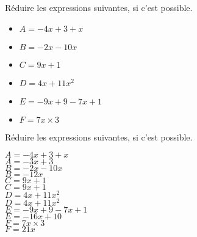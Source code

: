 \begin{exercice*}
    Réduire les expressions suivantes, si c'est possible.
    \begin{multicols}{2}
        \begin{itemize}
            \item[] $A=-4x+3+x$
            \item[] $B=-2x-10x$
            \item[] $C=9x+1$
            \item[] $D=4x+11x^2$
            \item[] $E=-9x+9-7x+1$
            \item[] $F=7x\times 3$
        \end{itemize}
    \end{multicols}
\end{exercice*}
\begin{corrige}
    Réduire les expressions suivantes, si c'est possible.
    \begin{multicols}{2}
        \begin{itemize}
            \def\item{}
            \item $A=-4x+3+x$\\
            {\red $A=-3x+3$}\\\smallskip
            \item $B=-2x-10x$\\
            {\red $B=-12x$}\\\smallskip
            \item $C=9x+1$\\
            {\red $C=9x+1$}\\\smallskip
            \item $D=4x+11x^2$\\
            {\red $D=4x+11x^2$}\\\smallskip
            \item $E=-9x+9-7x+1$\\
            {\red $E=-16x+10$}\\\smallskip
            \item $F=7x\times 3$\\
            {\red $F=21x$}
        \end{itemize}
    \end{multicols}
    \vspace*{-5mm}
\end{corrige}

